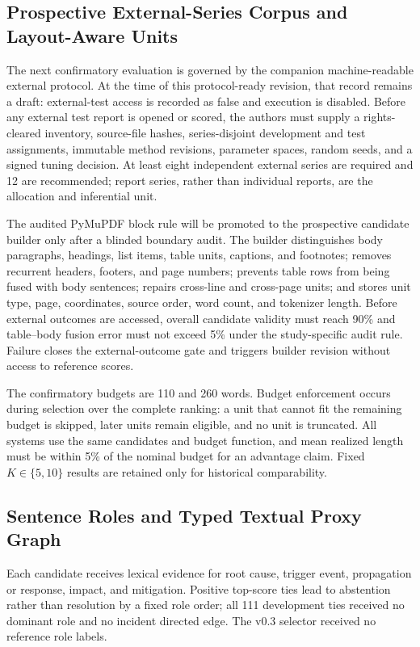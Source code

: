 \documentclass[applsci,article,submit,moreauthors]{Definitions/mdpi}
\begin{document}
\subsection{Prospective External-Series Corpus and Layout-Aware Units}

The next confirmatory evaluation is governed by the companion machine-readable external protocol. At the time of this protocol-ready revision, that record remains a draft: external-test access is recorded as false and execution is disabled. Before any external test report is opened or scored, the authors must supply a rights-cleared inventory, source-file hashes, series-disjoint development and test assignments, immutable method revisions, parameter spaces, random seeds, and a signed tuning decision. At least eight independent external series are required and 12 are recommended; report series, rather than individual reports, are the allocation and inferential unit.

The audited PyMuPDF block rule will be promoted to the prospective candidate builder only after a blinded boundary audit. The builder distinguishes body paragraphs, headings, list items, table units, captions, and footnotes; removes recurrent headers, footers, and page numbers; prevents table rows from being fused with body sentences; repairs cross-line and cross-page units; and stores unit type, page, coordinates, source order, word count, and tokenizer length. Before external outcomes are accessed, overall candidate validity must reach 90\% and table--body fusion error must not exceed 5\% under the study-specific audit rule. Failure closes the external-outcome gate and triggers builder revision without access to reference scores.

The confirmatory budgets are 110 and 260 words. Budget enforcement occurs during selection over the complete ranking: a unit that cannot fit the remaining budget is skipped, later units remain eligible, and no unit is truncated. All systems use the same candidates and budget function, and mean realized length must be within 5\% of the nominal budget for an advantage claim. Fixed $K\in\{5,10\}$ results are retained only for historical comparability.

\subsection{Sentence Roles and Typed Textual Proxy Graph}

Each candidate receives lexical evidence for root cause, trigger event, propagation or response, impact, and mitigation. Positive top-score ties lead to abstention rather than resolution by a fixed role order; all 111 development ties received no dominant role and no incident directed edge. The v0.3 selector received no reference role labels.
\end{document}
